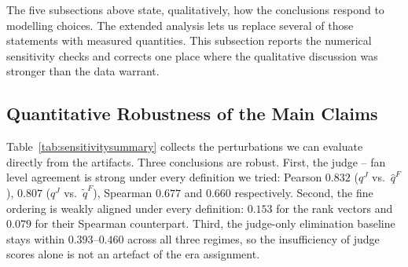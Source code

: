 
The five subsections above state, qualitatively, how the conclusions respond to modelling
choices. The extended analysis lets us replace several of those statements with measured
quantities. This subsection reports the numerical sensitivity checks and corrects one place
where the qualitative discussion was stronger than the data warrant.

\subsection{Quantitative Robustness of the Main Claims}\label{sec:quantsensitivity}

Table~\ref{tab:sensitivitysummary} collects the perturbations we can evaluate directly from
the artifacts. Three conclusions are robust. First, the judge -- fan level agreement is strong
under every definition we tried: Pearson $0.832$ ($q^J$ vs.\ $\hat q^F$), $0.807$
($q^J$ vs.\ $\tilde q^F$), Spearman $0.677$ and $0.660$ respectively. Second, the fine
ordering is weakly aligned under every definition: $0.153$ for the rank vectors and $0.079$
for their Spearman counterpart. Third, the judge-only elimination baseline stays within
$0.393$--$0.460$ across all three regimes, so the insufficiency of judge scores alone is not
an artefact of the era assignment.

